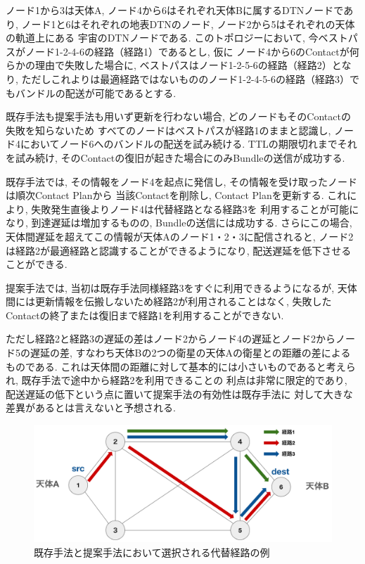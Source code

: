 ノード1から3は天体A, ノード4から6はそれぞれ天体Bに属するDTNノードであり, 
ノード1と6はそれぞれの地表DTNのノード, ノード2から5はそれぞれの天体の軌道上にある
宇宙のDTNノードである. 
このトポロジーにおいて, 今ベストパスがノード1-2-4-6の経路（経路1）であるとし, 仮に
ノード4から6のContactが何らかの理由で失敗した場合に, ベストパスはノード1-2-5-6の経路（経路2）となり, 
ただしこれよりは最適経路ではないもののノード1-2-4-5-6の経路（経路3）でもバンドルの配送が可能であるとする.

既存手法も提案手法も用いず更新を行わない場合, どのノードもそのContactの失敗を知らないため
すべてのノードはベストパスが経路1のままと認識し, ノード4においてノード6へのバンドルの配送を試み続ける.
TTLの期限切れまでそれを試み続け, そのContactの復旧が起きた場合にのみBundleの送信が成功する. 

既存手法では, その情報をノード4を起点に発信し, その情報を受け取ったノードは順次Contact Planから
当該Contactを削除し, Contact Planを更新する. これにより, 失敗発生直後よりノード4は代替経路となる経路3を
利用することが可能になり, 到達遅延は増加するものの, Bundleの送信には成功する. さらにこの場合, 
天体間遅延を超えてこの情報が天体Aのノード1・2・3に配信されると, 
ノード2は経路2が最適経路と認識することができるようになり, 配送遅延を低下させることができる. 

提案手法では, 当初は既存手法同様経路3をすぐに利用できるようになるが, 
天体間には更新情報を伝搬しないため経路2が利用されることはなく, 
失敗したContactの終了または復旧まで経路1を利用することができない. 

ただし経路2と経路3の遅延の差はノード2からノード4の遅延とノード2からノード5の遅延の差, 
すなわち天体Bの2つの衛星の天体Aの衛星との距離の差によるものである. 
これは天体間の距離に対して基本的には小さいものであると考えられ, 既存手法で途中から経路2を利用できることの
利点は非常に限定的であり, 配送遅延の低下という点に置いて提案手法の有効性は既存手法に
対して大きな差異があるとは言えないと予想される. 

\begin{figure}[tbh]
    \centering
    \includegraphics[width=0.7\textheight]{img/example_of_routechange.pdf}
    \caption{既存手法と提案手法において選択される代替経路の例}
    \label{fig:example_of_routechange}
    \begin{minipage}{\textwidth}
        \raggedright
        \vspace{3mm}
        \fontsize{10pt}{12pt}\selectfont
    \end{minipage}
\end{figure}

